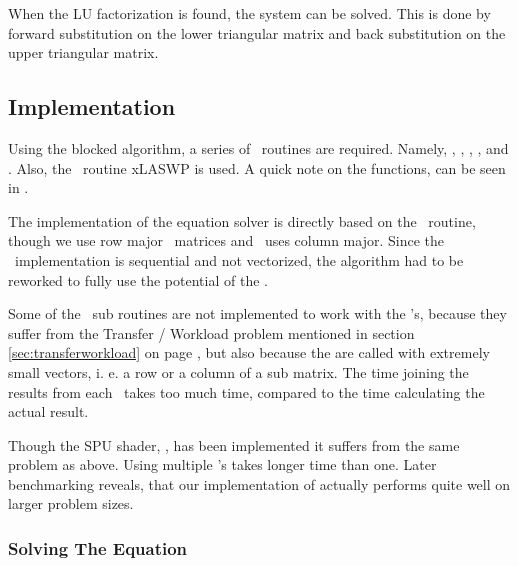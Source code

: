


When the LU factorization is found, the system can be solved. This is
done by forward substitution on the lower triangular matrix and back
substitution on the upper triangular matrix\cite{mathworld-lu}.

%

\subsection{Implementation}

Using the blocked algorithm, a series of \BLAS\ routines are
required. Namely, , ,
, ,  and
. Also, the \LAPACK\ routine {xLASWP} is used. A quick note on the functions, can be seen in .

The implementation of the equation solver is directly based on the
\LAPACK\ routine, though we use row major \FHB\ matrices and \LAPACK\ uses
column major. Since the \LAPACK\ implementation is sequential and not
vectorized, the algorithm had to be reworked to fully use the
potential of the \CBE{}.

Some of the \BLAS\ sub routines are not implemented to work with the
\SPE{}'s, because they suffer from the Transfer / Workload problem
mentioned in section \ref{sec:transferworkload} on page
\pageref{sec:transferworkload}, but also because the are called with
extremely small vectors, i. e. a row or a column of a sub matrix. The
time joining the results from each \SPE\ takes too much time, compared
to the time calculating the actual result.

Though the SPU shader, , has been implemented it
suffers from the same problem as above. Using multiple \SPE{}'s takes
longer time than one. Later benchmarking reveals, that our
implementation of  actually performs quite well on
larger problem sizes.


\subsubsection{Solving The Equation}

